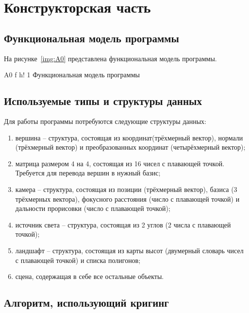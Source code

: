 \chapter{Конструкторская часть}

\section{Функциональная модель программы}

На рисунке~\ref{img:A0} представлена функциональная модель программы.

\FloatBarrier
{}
{A0} %
{f} %
{h!} %
{1\textwidth} %
{Функциональная модель программы} %
\FloatBarrier

\section{Используемые типы и структуры данных}

Для работы программы потребуются следующие структуры данных:

\begin{enumerate}
	\item вершина -- структура, состоящая из координат(трёхмерный вектор), нормали (трёхмерный вектор) и преобразованных координат (четырёхмерный вектор);
	\item матрица размером 4 на 4, состоящая из 16 чисел с плавающей точкой. Требуется для перевода вершин в нужный базис;
	\item камера -- структура, состоящая из позиции (трёхмерный вектор), базиса (3 трёхмерных вектора), фокусного расстояния (число с плавающей точкой) и дальности прорисовки (число с плавающей точкой);
	\item источник света -- структура, состоящая из 2 углов (2 числа с плавающей точкой);
	\item ландшафт -- структура, состоящая из карты высот (двумерный словарь чисел с плавающей точкой) и списка полигонов;
	\item сцена, содержащая в себе все остальные объекты.
\end{enumerate}

\section{Алгоритм, использующий кригинг}

